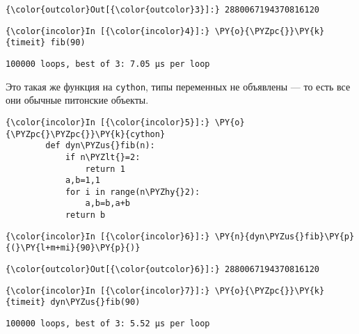             \begin{Verbatim}[commandchars=\\\{\}]
{\color{outcolor}Out[{\color{outcolor}3}]:} 2880067194370816120
\end{Verbatim}
        
    \begin{Verbatim}[commandchars=\\\{\}]
{\color{incolor}In [{\color{incolor}4}]:} \PY{o}{\PYZpc{}}\PY{k}{timeit} fib(90)
\end{Verbatim}

    \begin{Verbatim}[commandchars=\\\{\}]
100000 loops, best of 3: 7.05 µs per loop

    \end{Verbatim}

    Это такая же функция на \texttt{cython}, типы переменных не объявлены ---
то есть все они обычные питонские объекты.

    \begin{Verbatim}[commandchars=\\\{\}]
{\color{incolor}In [{\color{incolor}5}]:} \PY{o}{\PYZpc{}\PYZpc{}}\PY{k}{cython}
        def dyn\PYZus{}fib(n):
            if n\PYZlt{}=2:
                return 1
            a,b=1,1
            for i in range(n\PYZhy{}2):
                a,b=b,a+b
            return b
\end{Verbatim}

    \begin{Verbatim}[commandchars=\\\{\}]
{\color{incolor}In [{\color{incolor}6}]:} \PY{n}{dyn\PYZus{}fib}\PY{p}{(}\PY{l+m+mi}{90}\PY{p}{)}
\end{Verbatim}

            \begin{Verbatim}[commandchars=\\\{\}]
{\color{outcolor}Out[{\color{outcolor}6}]:} 2880067194370816120
\end{Verbatim}
        
    \begin{Verbatim}[commandchars=\\\{\}]
{\color{incolor}In [{\color{incolor}7}]:} \PY{o}{\PYZpc{}}\PY{k}{timeit} dyn\PYZus{}fib(90)
\end{Verbatim}

    \begin{Verbatim}[commandchars=\\\{\}]
100000 loops, best of 3: 5.52 µs per loop

    \end{Verbatim}

